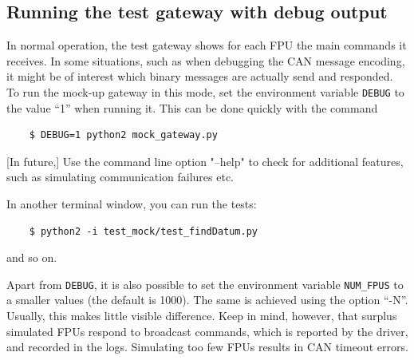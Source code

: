 \documentclass[11pt,a4paper]{scrartcl}
\begin{document}
\subsection{Running the test gateway with debug output}

In normal operation, the test gateway shows for each FPU the main
commands it receives. In some situations, such as when debugging the
CAN message encoding, it might be of interest which binary messages
are actually send and responded. To run the mock-up gateway in this
mode, set the environment variable \texttt{DEBUG} to the value ``1''
when running it. This can be done quickly with the command

  \begin{verbatim}
    $ DEBUG=1 python2 mock_gateway.py
  \end{verbatim}    



[In future,] Use the command line option "--help" to check for additional features,
such as simulating communication failures etc.

In another terminal window, you can run the tests:
  \begin{verbatim}
    $ python2 -i test_mock/test_findDatum.py
  \end{verbatim}    
and so on.

Apart from \texttt{DEBUG}, it is also possible to set the environment
variable \texttt{NUM\_FPUS} to a smaller values (the default is 1000).
The same is achieved using the option ``-N''.  Usually, this makes
little visible difference. Keep in mind, however, that surplus
simulated FPUs respond to broadcast commands, which is reported by the
driver, and recorded in the logs. Simulating too few FPUs results in
CAN timeout errors.

\printindex
\end{document}
